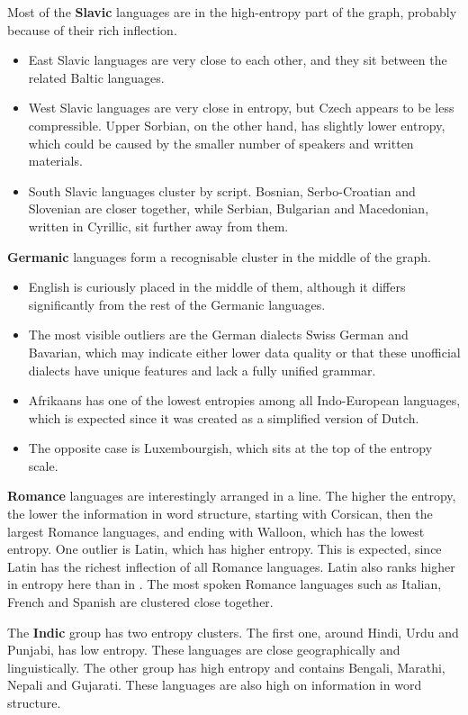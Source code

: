 Most of the \textbf{Slavic} languages are in the high-entropy part of the graph, probably because of their rich inflection.
\begin{itemize}
    \item East Slavic languages are very close to each other, and they sit between the related Baltic languages.
    \item West Slavic languages are very close in entropy, but Czech appears to be less compressible. Upper Sorbian, on the other hand, has slightly lower entropy, which could be caused by the smaller number of speakers and written materials.
    \item South Slavic languages cluster by script. Bosnian, Serbo-Croatian and Slovenian are closer together, while Serbian, Bulgarian and Macedonian, written in Cyrillic, sit further away from them.
\end{itemize}

\textbf{Germanic} languages form a recognisable cluster in the middle of the graph.
\begin{itemize}
    \item English is curiously placed in the middle of them, although it differs significantly from the rest of the Germanic languages.
    \item The most visible outliers are the German dialects Swiss German and Bavarian, which may indicate either lower data quality or that these unofficial dialects have unique features and lack a fully unified grammar.
    \item Afrikaans has one of the lowest entropies among all Indo-European languages, which is expected since it was created as a simplified version of Dutch.
    \item The opposite case is Luxembourgish, which sits at the top of the entropy scale.
\end{itemize}

\textbf{Romance} languages are interestingly arranged in a line. The higher the entropy, the lower the information in word structure, starting with Corsican, then the largest Romance languages, and ending with Walloon, which has the lowest entropy. One outlier is Latin, which has higher entropy. This is expected, since Latin has the richest inflection of all Romance languages. Latin also ranks higher in entropy here than in \textcite{Coltekin2022}. The most spoken Romance languages such as Italian, French and Spanish are clustered close together.

The \textbf{Indic} group has two entropy clusters. The first one, around Hindi, Urdu and Punjabi, has low entropy. These languages are close geographically and linguistically. The other group has high entropy and contains Bengali, Marathi, Nepali and Gujarati. These languages are also high on information in word structure.

